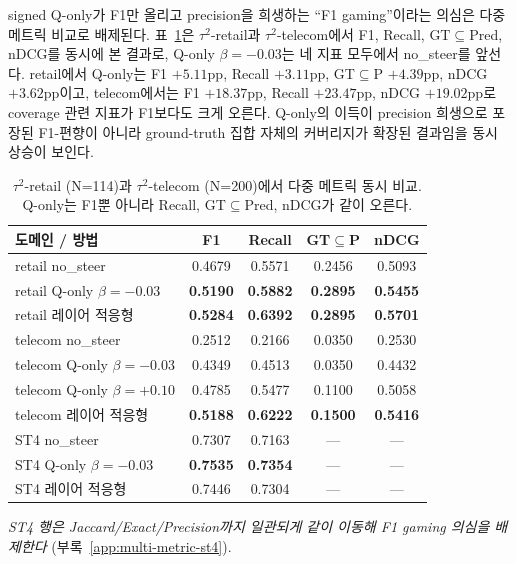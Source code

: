 signed Q-only가 F1만 올리고 precision을 희생하는 ``F1 gaming''이라는 의심은 다중 메트릭 비교로 배제된다. 표~\ref{tab:multi-metric}은 $\tau^2$-retail과 $\tau^2$-telecom에서 F1, Recall, GT$\subseteq$Pred, nDCG를 동시에 본 결과로, Q-only $\beta{=}{-}0.03$는 네 지표 모두에서 no\_steer를 앞선다. retail에서 Q-only는 F1 $+5.11$pp, Recall $+3.11$pp, GT$\subseteq$P $+4.39$pp, nDCG $+3.62$pp이고, telecom에서는 F1 $+18.37$pp, Recall $+23.47$pp, nDCG $+19.02$pp로 coverage 관련 지표가 F1보다도 크게 오른다. Q-only의 이득이 precision 희생으로 포장된 F1-편향이 아니라 ground-truth 집합 자체의 커버리지가 확장된 결과임을 동시 상승이 보인다.

\begin{table}[t]
\centering
\caption{$\tau^2$-retail (N=114)과 $\tau^2$-telecom (N=200)에서 다중 메트릭 동시 비교. Q-only는 F1뿐 아니라 Recall, GT$\subseteq$Pred, nDCG가 같이 오른다.}
\label{tab:multi-metric}
\small
\begin{tabularx}{\linewidth}{@{}Xcccc@{}}
\toprule
도메인 / 방법 & F1 & Recall & GT$\subseteq$P & nDCG \\
\midrule
retail no\_steer & 0.4679 & 0.5571 & 0.2456 & 0.5093 \\
retail Q-only $\beta{=}{-}0.03$ & \textbf{0.5190} & \textbf{0.5882} & \textbf{0.2895} & \textbf{0.5455} \\
retail 레이어 적응형 & \textbf{0.5284} & \textbf{0.6392} & \textbf{0.2895} & \textbf{0.5701} \\
\midrule
telecom no\_steer & 0.2512 & 0.2166 & 0.0350 & 0.2530 \\
telecom Q-only $\beta{=}{-}0.03$ & 0.4349 & 0.4513 & 0.0350 & 0.4432 \\
telecom Q-only $\beta{=}{+}0.10$ & 0.4785 & 0.5477 & 0.1100 & 0.5058 \\
telecom 레이어 적응형 & \textbf{0.5188} & \textbf{0.6222} & \textbf{0.1500} & \textbf{0.5416} \\
\midrule
ST4 no\_steer & 0.7307 & 0.7163 & --- & --- \\
ST4 Q-only $\beta{=}{-}0.03$ & \textbf{0.7535} & \textbf{0.7354} & --- & --- \\
ST4 레이어 적응형 & 0.7446 & 0.7304 & --- & --- \\
\bottomrule
\end{tabularx}
\emph{ST4 행은 Jaccard/Exact/Precision까지 일관되게 같이 이동해 F1 gaming 의심을 배제한다} (부록~\ref{app:multi-metric-st4}).
\end{table}

